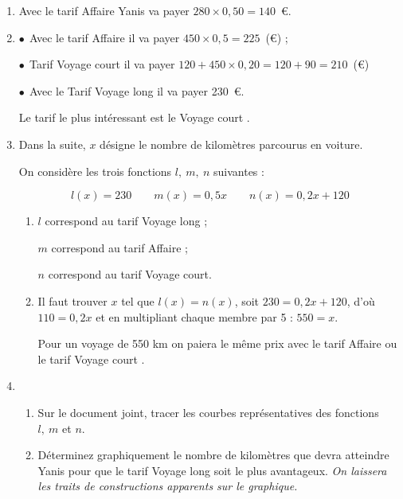 \begin{enumerate}
\item %


Avec le tarif \og Affaire \fg{}  Yanis va payer $280 \times 0,50 = 140$~\euro.
\item %
$\bullet~~$Avec le tarif \og Affaire \fg{} il va payer $450 \times 0,5 = 225$~(\euro)  ;

$\bullet~~$Tarif \og Voyage court \fg{} il va payer $120 + 450 \times 0,20 = 120 + 90 = 210$~(\euro)

$\bullet~~$Avec le Tarif \og Voyage long \fg{} il va payer 230~\euro.

Le tarif le plus intéressant est le \og Voyage court \fg.
\item Dans la suite, $x$ désigne le nombre de kilomètres parcourus en voiture.

On considère les trois fonctions  $l,\:m,\:n$ suivantes :

\[l(x) = 230 \qquad m(x) = 0,5x \qquad n(x) = 0,2x + 120\]

	\begin{enumerate}
		\item %
		
$l$ correspond au tarif \og Voyage long{} ;

$m$ correspond au tarif \og Affaire \fg{} ;

$n$ correspond au tarif \og Voyage court.
		\item %
		Il faut trouver $x$ tel que $l(x) = n(x)$, soit $ 230 = 0,2x + 120$, d'où $110 = 0,2x$ et en multipliant chaque membre par 5 : $550 = x$.
		
		Pour un voyage de 550 km on paiera le même prix avec le tarif \og Affaire \fg{} ou le tarif \og Voyage court \fg.
	\end{enumerate}
\item 
	\begin{enumerate}
		\item Sur le document joint, tracer les courbes représentatives des fonctions $l,\:m$ et $n$.	
		\item Déterminez graphiquement le nombre de kilomètres que devra atteindre Yanis  pour que le tarif \og Voyage long \fg{} soit le plus avantageux.
		\emph{On laissera les traits de constructions apparents sur le graphique.}


\end{enumerate}
\end{enumerate}
